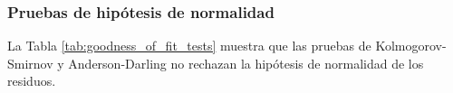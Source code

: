 \subsubsection{Pruebas de hipótesis de normalidad}

La Tabla \ref{tab:goodness_of_fit_tests} muestra que las pruebas de Kolmogorov-Smirnov y Anderson-Darling no rechazan la hipótesis de normalidad de los residuos.

